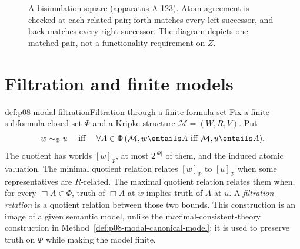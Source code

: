 \begin{figure}[!htbp]
\centering
{}
\caption{A bisimulation square (apparatus A-123).  Atom agreement is checked
at each related pair; forth matches every left successor, and back matches
every right successor.  The diagram depicts one matched pair, not a
functionality requirement on \(Z\).}
\label{fig:p08-modal-bisimulation}
\end{figure}

\section{Filtration and finite models}\label{sec:p08-modal-filtration}

\begin{hbmethod}{def:p08-modal-filtration}{Filtration through a finite formula set}
Fix a finite subformula-closed set \(\Phi\) and a Kripke structure
\(\mathcal M=(W,R,V)\).  Put
\[
 w\sim_{\Phi}u
 \quad\text{ iff }\quad
 \forall A\in\Phi\,
   (\mathcal M,w\entails A\text{ iff }\mathcal M,u\entails A).
\]
The quotient has worlds \([w]_{\Phi}\), at most \(2^{\lvert\Phi\rvert}\)
of them, and the induced atomic valuation.  The minimal quotient relation
relates \([w]_{\Phi}\) to \([u]_{\Phi}\) when some representatives are
\(R\)-related.  The maximal quotient relation relates them when, for every
\(\Box A\in\Phi\), truth of \(\Box A\) at \(w\) implies truth of \(A\) at
\(u\).  A \emph{filtration relation} is a quotient relation between those two
bounds.  This construction is an image of a given semantic model, unlike the
maximal-consistent-theory construction in
Method~\ref{def:p08-modal-canonical-model}; it is used to preserve truth on
\(\Phi\) while making the model finite.
\end{hbmethod}


